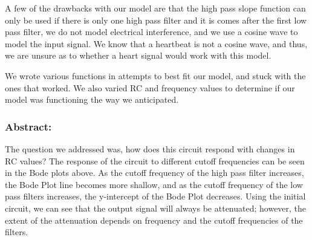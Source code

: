 \documentclass[11pt]{article}
\begin{document}
    A few of the drawbacks with our model are that the high pass slope
function can only be used if there is only one high pass filter and it
is comes after the first low pass filter, we do not model electrical
interference, and we use a cosine wave to model the input signal. We
know that a heartbeat is not a cosine wave, and thus, we are unsure as
to whether a heart signal would work with this model.

    We wrote various functions in attempts to best fit our model, and stuck
with the ones that worked. We also varied RC and frequency values to
determine if our model was functioning the way we anticipated.

    \subsubsection{Abstract:}\label{abstract}

    The question we addressed was, how does this circuit respond with
changes in RC values? The response of the circuit to different cutoff
frequencies can be seen in the Bode plots above. As the cutoff frequency
of the high pass filter increases, the Bode Plot line becomes more
shallow, and as the cutoff frequency of the low pass filters increases,
the y-intercept of the Bode Plot decreases. Using the initial circuit,
we can see that the output signal will always be attenuated; however,
the extent of the attenuation depends on frequency and the cutoff
frequencies of the filters.
\end{document}
